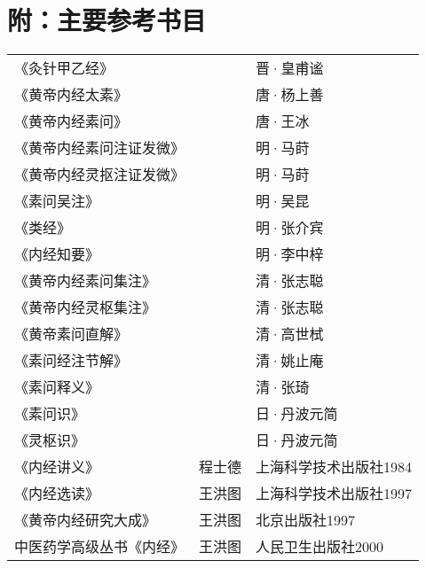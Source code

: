\documentclass[12pt]{ctexbook}
\begin{document}
\fi

\chapter*{附：主要参考书目}
\begin{table}[h]
    \centering
    \begin{tabular}{lll}
    《灸针甲乙经》 &  & 晋·皇甫谧 \\
    《黄帝内经太素》 &  & 唐·杨上善 \\
    《黄帝内经素问》 &  & 唐·王冰 \\
    《黄帝内经素问注证发微》 &  & 明·马莳 \\
    《黄帝内经灵抠注证发微》 &  & 明·马莳 \\
    《素问吴注》 &  & 明·吴昆 \\
    《类经》 &  & 明·张介宾 \\
    《内经知要》 &  & 明·李中梓 \\
    《黄帝内经素问集注》 &  & 清·张志聪 \\
    《黄帝内经灵枢集注》 &  & 清·张志聪 \\
    《黄帝素问直解》 &  & 清·高世栻 \\
    《素问经注节解》 &  & 清·姚止庵 \\
    《素问释义》 &  & 清·张琦 \\
    《素问识》 &  & 日·丹波元简 \\
    《灵枢识》 &  & 日·丹波元简 \\
    《内经讲义》 & 程士德 & 上海科学技术出版社1984 \\
    《内经选读》 & 王洪图 & 上海科学技术出版社1997 \\
    《黄帝内经研究大成》 & 王洪图 & 北京出版社1997 \\
    中医药学高级丛书《内经》 & 王洪图 & 人民卫生出版社2000
    \end{tabular}
\end{table}
\ifx \allfiles \undefined
\end{document}
